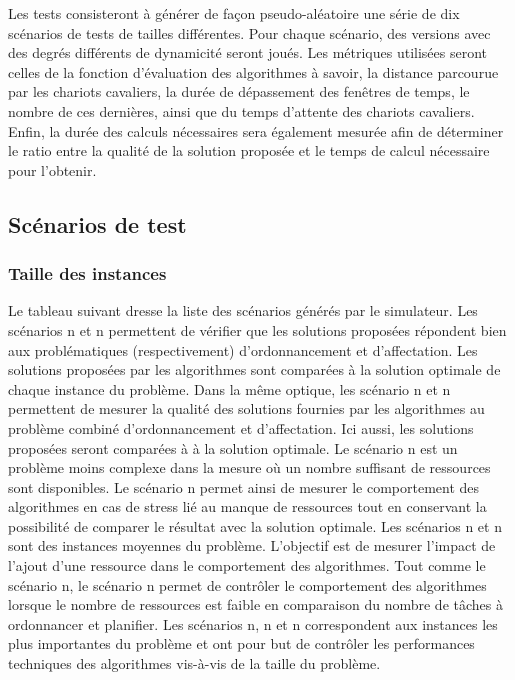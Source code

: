   Les tests consisteront à générer de façon pseudo-aléatoire une série de dix scénarios de tests de tailles différentes. Pour chaque scénario, des versions avec des degrés différents de dynamicité seront joués. Les métriques utilisées seront celles de la fonction d'évaluation des algorithmes à savoir, la distance parcourue par les chariots cavaliers, la durée de dépassement des fenêtres de temps, le nombre de ces dernières, ainsi que du temps d'attente des chariots cavaliers. Enfin, la durée des calculs nécessaires sera également mesurée afin de déterminer le ratio entre la qualité de la solution proposée et le temps de calcul nécessaire pour l'obtenir.

  \subsection{Scénarios de test} %

  \subsubsection{Taille des instances}
  Le tableau suivant dresse la liste des scénarios générés par le simulateur. Les scénarios n et n permettent de vérifier que les solutions proposées répondent bien aux problématiques (respectivement) d'ordonnancement et d'affectation. Les solutions proposées par les algorithmes sont comparées à la solution optimale de chaque instance du problème.
  Dans la même optique, les scénario n et n permettent de mesurer la qualité des solutions fournies par les algorithmes au problème combiné d'ordonnancement et d'affectation. Ici aussi, les solutions proposées seront comparées à à la solution optimale. Le scénario n est un problème moins complexe dans la mesure où un nombre suffisant de ressources sont disponibles. Le scénario n permet ainsi de mesurer le comportement des algorithmes en cas de stress lié au manque de ressources tout en conservant la possibilité de comparer le résultat avec la solution optimale.
  Les scénarios n et n sont des instances moyennes du problème. L'objectif est de mesurer l'impact de l'ajout d'une ressource dans le comportement des algorithmes.
  Tout comme le scénario n, le scénario n permet de contrôler le comportement des algorithmes lorsque le nombre de ressources est faible en comparaison du nombre de tâches à ordonnancer et planifier.
  Les scénarios n, n et n correspondent aux instances les plus importantes du problème et ont pour but de contrôler les performances techniques des algorithmes vis-à-vis de la taille du problème.

